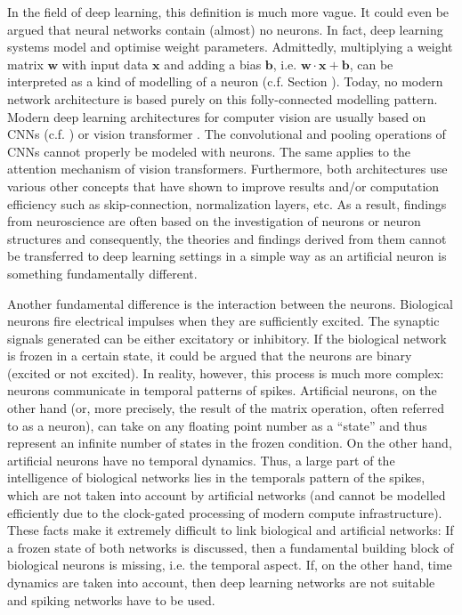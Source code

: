 In the field of deep learning, this definition is much more vague. It could even be argued that neural networks contain (almost) no neurons. In fact, deep learning systems model and optimise weight parameters. Admittedly, multiplying a weight matrix $\boldsymbol{w}$ with input data $\boldsymbol{x}$ and adding a bias $\boldsymbol{b}$, i.e. $\boldsymbol{w} \cdot \boldsymbol{x} + \boldsymbol{b}$, can be interpreted as a kind of modelling of a neuron (c.f. Section ). 
Today, no modern network architecture is based purely on this folly-connected modelling pattern.
Modern deep learning architectures for computer vision are usually based on CNNs (c.f. ) or vision transformer . The convolutional and pooling operations of CNNs cannot properly be modeled with neurons. The same applies to the attention mechanism of vision transformers. Furthermore, both architectures use various other concepts that have shown to improve results and/or computation efficiency such as skip-connection, normalization layers, etc.
As a result, findings from neuroscience are often based on the investigation of neurons or neuron structures and consequently, the theories and findings derived from them cannot be transferred to deep learning settings in a simple way as an artificial neuron is something fundamentally different.

Another fundamental difference is the interaction between the neurons. Biological neurons fire electrical impulses when they are sufficiently excited. The synaptic signals generated can be either excitatory or inhibitory. If the biological network is frozen in a certain state, it could be argued that the neurons are binary (excited or not excited). In reality, however, this process is much more complex: neurons communicate in temporal patterns of spikes.
Artificial neurons, on the other hand (or, more precisely, the result of the matrix operation, often referred to as a neuron), can take on any floating point number as a ``state'' and thus represent an infinite number of states in the frozen condition. On the other hand, artificial neurons have no temporal dynamics. Thus, a large part of the intelligence of biological networks lies in the temporals pattern of the spikes, which are not taken into account by artificial networks (and cannot be modelled efficiently due to the clock-gated processing of modern compute infrastructure). These facts make it extremely difficult to link biological and artificial networks: If a frozen state of both networks is discussed, then a fundamental building block of biological neurons is missing, i.e. the temporal aspect. If, on the other hand, time dynamics are taken into account, then deep learning networks are not suitable and spiking networks have to be used.

